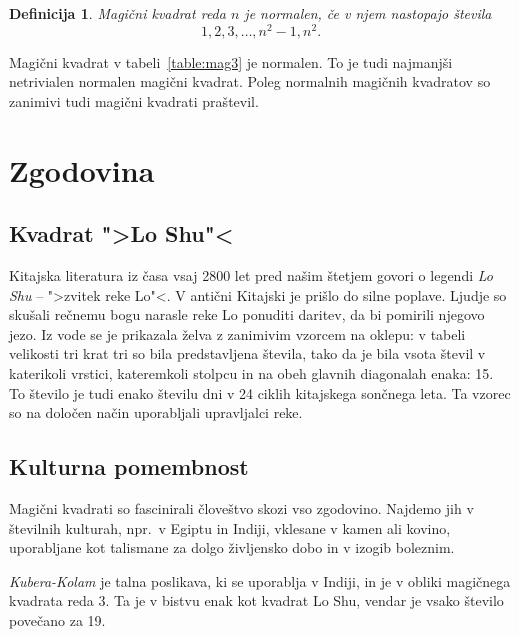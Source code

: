 \documentclass[a4paper,12pt]{article}
\newtheorem{definicija}{Definicija}
\begin{document}
\begin{definicija}
   Magični kvadrat reda \(n\) je \emph{normalen}, če v njem nastopajo števila
   \begin{equation}
      \label{eq:numbers}
      1, 2, 3, \ldots, n^2-1, n^2.
   \end{equation}
\end{definicija}

Magični kvadrat v tabeli~\ref{table:mag3} je normalen.
To je tudi najmanjši netrivialen normalen magični kvadrat.
Poleg normalnih magičnih kvadratov so zanimivi tudi magični kvadrati praštevil. %


\section{Zgodovina}

\subsection{Kvadrat ">Lo Shu"<}

Kitajska literatura iz časa vsaj 2800 let pred našim štetjem govori o legendi
\emph{Lo Shu} -- ">zvitek reke Lo"<. V antični Kitajski je prišlo do
silne poplave. Ljudje so skušali rečnemu bogu narasle reke Lo ponuditi daritev,
da bi pomirili njegovo jezo. Iz vode se je prikazala želva z zanimivim vzorcem
na oklepu: v tabeli velikosti tri krat tri so bila predstavljena števila, tako
da je bila vsota števil v katerikoli vrstici, kateremkoli stolpcu in na obeh
glavnih diagonalah enaka: 15. To število je tudi enako številu dni v 24 ciklih
kitajskega sončnega leta. Ta vzorec so na določen način uporabljali upravljalci
reke.


\subsection{Kulturna pomembnost}

Magični kvadrati so fascinirali človeštvo skozi vso zgodovino. Najdemo jih
v številnih kulturah, npr.\ v Egiptu in Indiji, vklesane v kamen ali
kovino, uporabljane kot talismane za dolgo življensko dobo in v
izogib boleznim.

\emph{Kubera-Kolam} je talna poslikava, ki se uporablja v Indiji, in je v
obliki magičnega kvadrata reda 3. Ta je v bistvu enak kot kvadrat
Lo Shu, vendar je vsako število povečano za 19.
\end{document}
